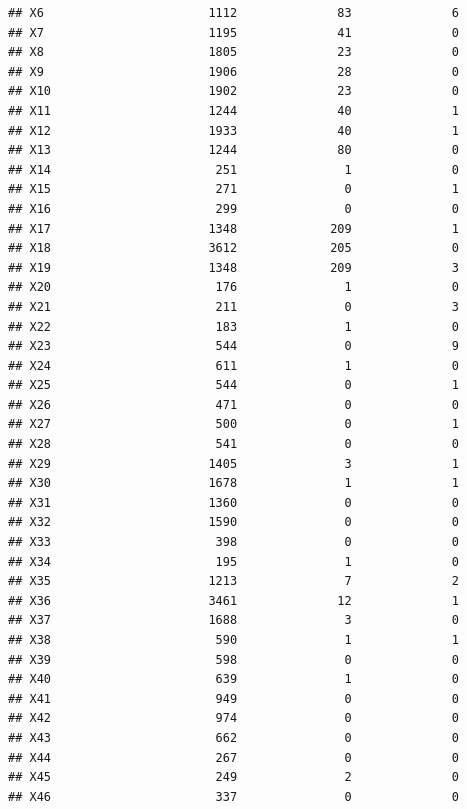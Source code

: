 \documentclass[12pt]{beamer}\usepackage[]{graphicx}\usepackage[]{color}
\makeatletter
\newenvironment{kframe}{%
 \def\at@end@of@kframe{}%
 \ifinner\ifhmode%
  \def\at@end@of@kframe{\end{minipage}}%
  \begin{minipage}{\columnwidth}%
 \fi\fi%
 \def\FrameCommand##1{\hskip\@totalleftmargin \hskip-\fboxsep
 \colorbox{shadecolor}{##1}\hskip-\fboxsep
     \hskip-\linewidth \hskip-\@totalleftmargin \hskip\columnwidth}%
 \MakeFramed {\advance\hsize-\width
   \@totalleftmargin\z@ \linewidth\hsize
   \@setminipage}}%
 {\par\unskip\endMakeFramed%
 \at@end@of@kframe}
\newenvironment{knitrout}{}{} %
\makeatother
\begin{document}
\begin{frame}[fragile]
\begin{knitrout}
\begin{kframe}
\begin{verbatim}
## X6                       1112              83              6
## X7                       1195              41              0
## X8                       1805              23              0
## X9                       1906              28              0
## X10                      1902              23              0
## X11                      1244              40              1
## X12                      1933              40              1
## X13                      1244              80              0
## X14                       251               1              0
## X15                       271               0              1
## X16                       299               0              0
## X17                      1348             209              1
## X18                      3612             205              0
## X19                      1348             209              3
## X20                       176               1              0
## X21                       211               0              3
## X22                       183               1              0
## X23                       544               0              9
## X24                       611               1              0
## X25                       544               0              1
## X26                       471               0              0
## X27                       500               0              1
## X28                       541               0              0
## X29                      1405               3              1
## X30                      1678               1              1
## X31                      1360               0              0
## X32                      1590               0              0
## X33                       398               0              0
## X34                       195               1              0
## X35                      1213               7              2
## X36                      3461              12              1
## X37                      1688               3              0
## X38                       590               1              1
## X39                       598               0              0
## X40                       639               1              0
## X41                       949               0              0
## X42                       974               0              0
## X43                       662               0              0
## X44                       267               0              0
## X45                       249               2              0
## X46                       337               0              0

\end{verbatim}
\end{kframe}
\end{knitrout}
\end{frame}
\end{document}
